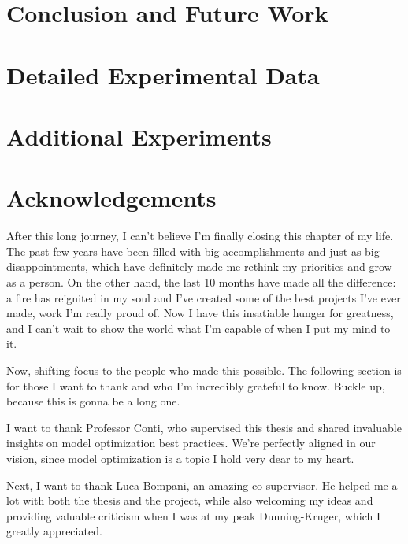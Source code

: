 \documentclass[12pt,a4paper,openright,twoside]{report}
\begin{document}
\chapter{Conclusion and Future Work}
\label{chap:conclusion}
\lhead[\fancyplain{}{\bfseries\thepage}]{\fancyplain{}{\bfseries\rightmark}}




\appendix
\chapter{Detailed Experimental Data}
\label{app:appendix1}


\chapter{Additional Experiments}
\label{app:appendix2}


\chapter*{Acknowledgements}

After this long journey, I can't believe I'm finally closing this chapter of my life. The past few years have been filled with big accomplishments and just as big disappointments, which have definitely made me rethink my priorities and grow as a person. On the other hand, the last 10 months have made all the difference: a fire has reignited in my soul and I've created some of the best projects I've ever made, work I'm really proud of. Now I have this insatiable hunger for greatness, and I can't wait to show the world what I'm capable of when I put my mind to it.

Now, shifting focus to the people who made this possible. The following section is for those I want to thank and who I'm incredibly grateful to know. Buckle up, because this is gonna be a long one.

I want to thank Professor Conti, who supervised this thesis and shared invaluable insights on model optimization best practices. We're perfectly aligned in our vision, since model optimization is a topic I hold very dear to my heart.

Next, I want to thank Luca Bompani, an amazing co-supervisor. He helped me a lot with both the thesis and the project, while also welcoming my ideas and providing valuable criticism when I was at my peak Dunning-Kruger, which I greatly appreciated.
\end{document}
